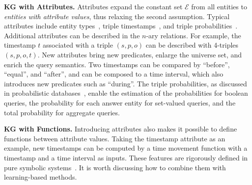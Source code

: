 \documentclass[11pt]{article}
\newcommand{\entity}{\mathcal{E}}
\begin{document}
\noindent\textbf{KG with Attributes.} Attributes expand the constant set $\entity$ from all entities to \textit{entities with attribute values}, thus relaxing the second assumption. Typical attributes include entity types~\cite{Auer2007DBpediaNucleus,Hu2022TypeawareEmbeddings}, triple timestamps~\cite{Jia2021ComplexTemporal,Saxena2021QuestionAnswering}, and triple probabilities~\cite{Carlson2010ArchitectureNeverEnding}. Additional attributes can be described in the $n$-ary relations. For example, the timestamp $t$ associated with a triple $(s, p, o)$ can be described with 4-triples $(s, p, o, t)$. New attributes bring new predicates, enlarge the universe set, and enrich the query semantics. Two timestamps can be compared by ``before'', ``equal'', and ``after'', and can be composed to a time interval, which also introduces new predicates such as ``during''. The triple probabilities, as discussed in probabilistic databases~\cite{VandenBroeck2017QueryProcessing}, enable the estimation of the probabilities for boolean queries, the probability for each answer entity for set-valued queries, and the total probability for aggregate queries.

\noindent\textbf{KG with Functions.} Introducing attributes also makes it possible to define functions between attribute values. Taking the timestamp attribute as an example, new timestamps can be computed by a time movement function with a timestamp and a time interval as inputs. These features are rigorously defined in pure symbolic systems~\cite{emerson1990temporal}. It is worth discussing how to combine them with learning-based methods.
\end{document}

